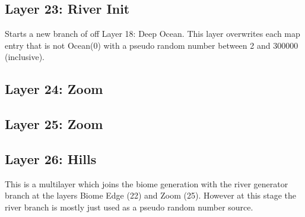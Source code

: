 \documentclass{article}
\begin{document}
	\subsection{Layer 23: River Init}
	
	Starts a new branch of off Layer 18: Deep Ocean. This layer overwrites each map entry that is not Ocean(0) with a pseudo random number between 2 and 300000 (inclusive).
	
	\subsection{Layer 24: Zoom}
	\subsection{Layer 25: Zoom}
	
	\subsection{Layer 26: Hills}
	This is a multilayer which joins the biome generation with the river generator branch at the layers Biome Edge (22) and Zoom (25). However at this stage the river branch is mostly just used as a pseudo random number source. 
	
\end{document}

